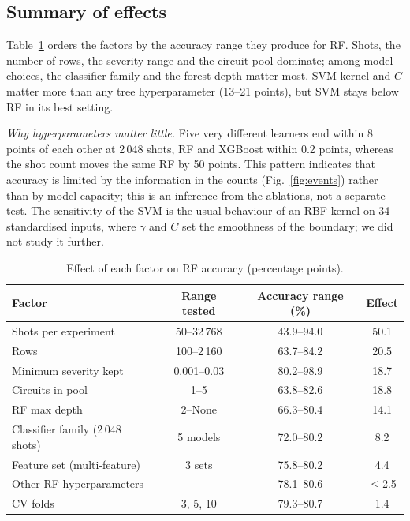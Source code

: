 \documentclass[conference]{IEEEtran}
\begin{document}
\subsection{Summary of effects}
Table~\ref{tab:effects} orders the factors by the accuracy range they produce for RF. Shots, the number of rows, the severity range and the circuit pool dominate; among model choices, the classifier family and the forest depth matter most. SVM kernel and $C$ matter more than any tree hyperparameter (13--21 points), but SVM stays below RF in its best setting.

\emph{Why hyperparameters matter little.} Five very different learners end within 8 points of each other at 2\,048 shots, RF and XGBoost within 0.2 points, whereas the shot count moves the same RF by 50 points. This pattern indicates that accuracy is limited by the information in the counts (Fig.~\ref{fig:events}) rather than by model capacity; this is an inference from the ablations, not a separate test. The sensitivity of the SVM is the usual behaviour of an RBF kernel on 34 standardised inputs, where $\gamma$ and $C$ set the smoothness of the boundary; we did not study it further.

\begin{table}[!t]
\caption{Effect of each factor on RF accuracy (percentage points).}
\label{tab:effects}
\centering\scriptsize\setlength{\tabcolsep}{3pt}
\begin{tabular}{@{}lccc@{}}
\toprule
Factor & Range tested & Accuracy range (\%) & Effect\\
\midrule
Shots per experiment & 50--32\,768 & 43.9--94.0 & 50.1\\
Rows & 100--2\,160 & 63.7--84.2 & 20.5\\
Minimum severity kept & 0.001--0.03 & 80.2--98.9 & 18.7\\
Circuits in pool & 1--5 & 63.8--82.6 & 18.8\\
RF max depth & 2--None & 66.3--80.4 & 14.1\\
Classifier family (2\,048 shots) & 5 models & 72.0--80.2 & 8.2\\
Feature set (multi-feature) & 3 sets & 75.8--80.2 & 4.4\\
Other RF hyperparameters & -- & 78.1--80.6 & $\le$2.5\\
CV folds & 3, 5, 10 & 79.3--80.7 & 1.4\\
\bottomrule
\end{tabular}
\end{table}
\end{document}
